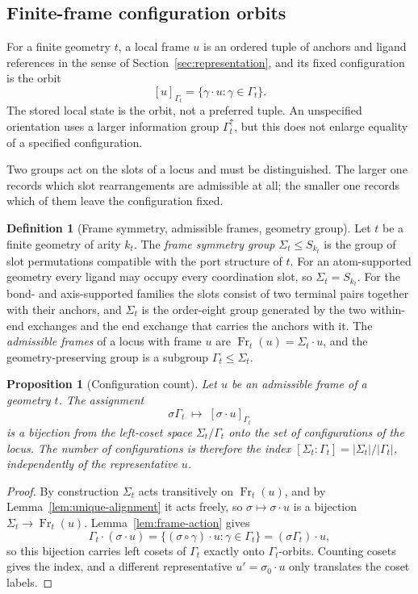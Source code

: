 \documentclass[pdflatex,sn-mathphys-num,referee,lineno]{sn-jnl}
\theoremstyle{plain}
\newtheorem{proposition}[theorem]{Proposition}
\theoremstyle{remark}
\theoremstyle{definition}
\newtheorem{definition}{Definition}
\begin{document}
\subsection{Finite-frame configuration orbits}
\label{sec:local-orbits}

For a finite geometry \(t\), a local frame \(u\) is an ordered tuple of anchors
and ligand references in the sense of Section~\ref{sec:representation}, and its
fixed configuration is the orbit
\[
  [u]_{\Gamma_t}=\{\gamma\cdot u:\gamma\in\Gamma_t\}.
\]
The stored local state is the orbit, not a preferred tuple.  An unspecified
orientation uses a larger information group
\(\Gamma_t^\uparrow\), but this does not enlarge equality of a specified
configuration.

Two groups act on the slots of a locus and must be distinguished.  The larger
one records which slot rearrangements are admissible at all; the smaller one
records which of them leave the configuration fixed.

\begin{definition}[Frame symmetry, admissible frames, geometry group]
\label{def:admissible-frames}
Let \(t\) be a finite geometry of arity \(k_t\).  The \emph{frame symmetry
group} \(\Sigma_t\leq S_{k_t}\) is the group of slot permutations compatible
with the port structure of \(t\).  For an atom-supported geometry every ligand
may occupy every coordination slot, so \(\Sigma_t=S_{k_t}\).  For the bond- and
axis-supported families the slots consist of two terminal pairs together with
their anchors, and \(\Sigma_t\) is the order-eight group generated by the two
within-end exchanges and the end exchange that carries the anchors with it.
The \emph{admissible frames} of a locus with frame \(u\) are
\(\operatorname{Fr}_t(u)=\Sigma_t\cdot u\), and the geometry-preserving group is
a subgroup \(\Gamma_t\leq\Sigma_t\).
\end{definition}

\begin{proposition}[Configuration count]
\label{prop:config-count}
Let \(u\) be an admissible frame of a geometry \(t\).  The assignment
\[
  \sigma\Gamma_t\;\longmapsto\;[\sigma\cdot u]_{\Gamma_t}
\]
is a bijection from the left-coset space \(\Sigma_t/\Gamma_t\) onto the set of
configurations of the locus.  The number of configurations is therefore the
index \([\Sigma_t:\Gamma_t]=|\Sigma_t|/|\Gamma_t|\), independently of the
representative \(u\).
\end{proposition}

\begin{proof}
By construction \(\Sigma_t\) acts transitively on \(\operatorname{Fr}_t(u)\),
and by Lemma~\ref{lem:unique-alignment} it acts freely, so
\(\sigma\mapsto\sigma\cdot u\) is a bijection
\(\Sigma_t\to\operatorname{Fr}_t(u)\).  Lemma~\ref{lem:frame-action} gives
\[
  \Gamma_t\cdot(\sigma\cdot u)
  =\{(\sigma\circ\gamma)\cdot u:\gamma\in\Gamma_t\}
  =(\sigma\Gamma_t)\cdot u ,
\]
so this bijection carries left cosets of \(\Gamma_t\) exactly onto
\(\Gamma_t\)-orbits.  Counting cosets gives the index, and a different
representative \(u'=\sigma_0\cdot u\) only translates the coset labels.
\end{proof}
\end{document}

